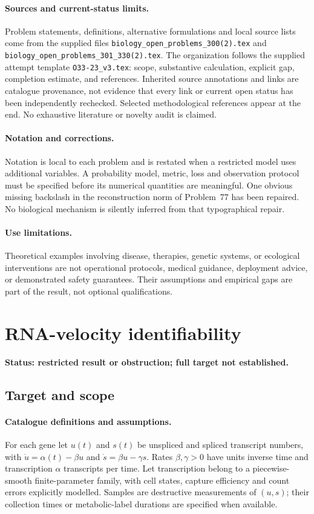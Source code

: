 \documentclass[11pt]{article}
\begin{document}
\paragraph{Sources and current-status limits.}
Problem statements, definitions, alternative formulations and local source lists
come from the supplied files
\texttt{biology\_open\_problems\_300(2).tex} and
\texttt{biology\_open\_problems\_301\_330(2).tex}.
The organization follows the supplied attempt template
\texttt{O33-23\_v3.tex}: scope, substantive calculation, explicit gap,
completion estimate, and references. Inherited source annotations and links are
catalogue provenance, not evidence that every link or current open status has
been independently rechecked. Selected methodological references appear at the
end. No exhaustive literature or novelty audit is claimed.

\paragraph{Notation and corrections.}
Notation is local to each problem and is restated when a restricted model uses
additional variables. A probability model, metric, loss and observation protocol
must be specified before its numerical quantities are meaningful. One obvious
missing backslash in the reconstruction norm of Problem~77 has been repaired.
No biological mechanism is silently inferred from that typographical repair.

\paragraph{Use limitations.}
Theoretical examples involving disease, therapies, genetic systems, or ecological
interventions are not operational protocols, medical guidance, deployment advice,
or demonstrated safety guarantees. Their assumptions and empirical gaps are part
of the result, not optional qualifications.


\section*{RNA-velocity identifiability}
\label{prob:072}
\noindent\textbf{Status: restricted result or obstruction; full target not established.}
\subsection{Target and scope}
\paragraph{Catalogue definitions and assumptions.}
For each gene let $u(t)$ and $s(t)$ be unspliced and spliced transcript numbers, with $\dot u=\alpha(t)-\beta u$ and $\dot s=\beta u-\gamma s$. Rates $\beta,\gamma>0$ have units inverse time and transcription $\alpha$ transcripts per time. Let transcription belong to a piecewise-smooth finite-parameter family, with cell states, capture efficiency and count errors explicitly modelled. Samples are destructive measurements of $(u,s)$; their collection times or metabolic-label durations are specified when available.
\end{document}
